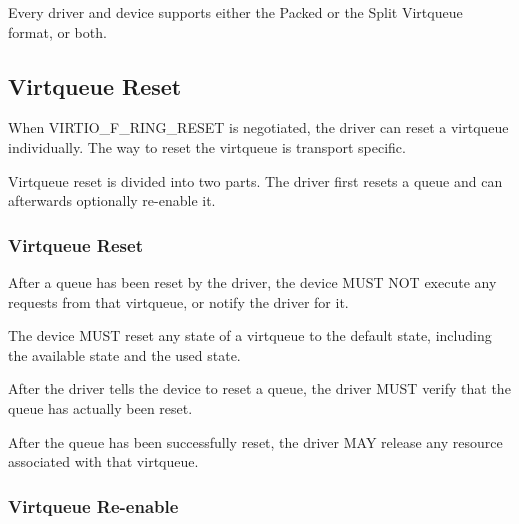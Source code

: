 Every driver and device supports either the Packed or the Split
Virtqueue format, or both.

\subsection{Virtqueue Reset}\label{sec:Basic Facilities of a Virtio Device / Virtqueues / Virtqueue Reset}

When VIRTIO_F_RING_RESET is negotiated, the driver can reset a virtqueue
individually. The way to reset the virtqueue is transport specific.

Virtqueue reset is divided into two parts. The driver first resets a queue and
can afterwards optionally re-enable it.

\subsubsection{Virtqueue Reset}\label{sec:Basic Facilities of a Virtio Device / Virtqueues / Virtqueue Reset / Virtqueue Reset}


After a queue has been reset by the driver, the device MUST NOT execute
any requests from that virtqueue, or notify the driver for it.

The device MUST reset any state of a virtqueue to the default state,
including the available state and the used state.


After the driver tells the device to reset a queue, the driver MUST verify that
the queue has actually been reset.

After the queue has been successfully reset, the driver MAY release any
resource associated with that virtqueue.

\subsubsection{Virtqueue Re-enable}\label{sec:Basic Facilities of a Virtio Device / Virtqueues / Virtqueue Reset / Virtqueue Re-enable}

